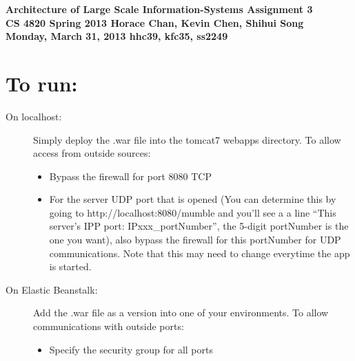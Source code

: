 \documentclass{article}
\begin{document}
\begin{framed}
  \large{\textbf{Architecture of Large Scale Information-Systems  \hfill Assignment 3\\
      CS 4820 Spring 2013 \hfill Horace Chan, Kevin Chen, Shihui Song \\
      Monday, March 31, 2013 \hfill hhc39, kfc35, ss2249
  }}
\end{framed}

\section{To run:}
  \begin{description}
    \item[On localhost:] Simply deploy the .war file into the tomcat7 webapps directory. To allow access from outside sources:
      \begin{itemize}
        \item Bypass the firewall for port 8080 TCP
        \item For the server UDP port that is opened (You can determine this by going to http://localhost:8080/mumble and you'll see a a line ``This server's IPP port: IPxxx\_portNumber'', the 5-digit portNumber is the one you want), also bypass the firewall for this portNumber for UDP communications. Note that this may need to change everytime the app is started.
      \end{itemize}
    \item[On Elastic Beanstalk:] Add the .war file as a version into one of your environments. To allow communications with outside ports:
      \begin{itemize}
        \item Specify the security group for all ports %
      \end{itemize}
  \end{description}
\end{document}
